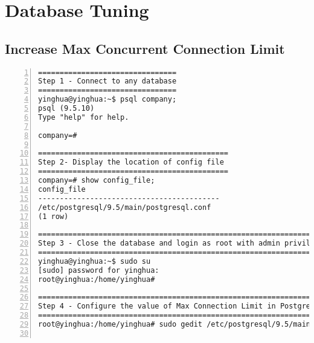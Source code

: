 \chapter{Database Tuning} 
\label{AppendixO} 


\section{Increase Max Concurrent Connection Limit}

\lstset{basicstyle=\ttfamily\tiny}  
\begin{lstlisting}[breaklines, frame=single, numbers=left, caption={Increase Max Concurrent Connection Limit}, label=commandline-02]
================================
Step 1 - Connect to any database 
================================
yinghua@yinghua:~$ psql company; 
psql (9.5.10)
Type "help" for help.

company=# 

============================================
Step 2- Display the location of config file 
============================================
company=# show config_file;
config_file                
------------------------------------------
/etc/postgresql/9.5/main/postgresql.conf
(1 row)

==================================================================================
Step 3 - Close the database and login as root with admin privileges on Ubuntu OS 
==================================================================================
yinghua@yinghua:~$ sudo su 
[sudo] password for yinghua: 
root@yinghua:/home/yinghua# 

==================================================================================
Step 4 - Configure the value of Max Connection Limit in PostgreSQL Configuration file
==================================================================================
root@yinghua:/home/yinghua# sudo gedit /etc/postgresql/9.5/main/postgresql.conf


\end{lstlisting}
